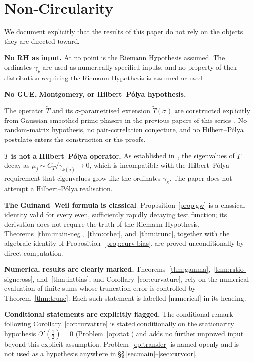 \documentclass[11pt]{article}
\newcommand{\Tt}{\widetilde{T}}
\newcommand{\CT}{C_{T}}
\begin{document}
\section{Non-Circularity}
\label{sec:nocirc}

We document explicitly that the results of this paper do not rely on
the objects they are directed toward.

\textbf{No RH as input.}
At no point is the Riemann Hypothesis assumed.
The ordinates $\gamma_k$ are used as numerically specified inputs, and
no property of their distribution requiring the Riemann Hypothesis is
assumed or used.

\textbf{No GUE, Montgomery, or Hilbert--P\'olya hypothesis.}
{\sloppy
The operator $\Tt$ and its $\sigma$-parametrised extension
$\Tt(\sigma)$ are constructed explicitly from Gaussian-smoothed prime
phasors in the previous papers of this series~\cite{Paper3,Paper4,Paper5}.
No random-matrix hypothesis, no pair-correlation conjecture, and no
Hilbert--P\'olya postulate enters the construction or the proofs.
\par}

\textbf{$\Tt$ is not a Hilbert--P\'olya operator.}
As established in~\cite{Paper5}, the eigenvalues of $\Tt$ decay as
$\mu_j\sim\CT/\gamma_{k(j)}\to 0$, which is incompatible with the
Hilbert--P\'olya requirement that eigenvalues grow like the ordinates
$\gamma_k$.
The paper does not attempt a Hilbert--P\'olya realisation.

\textbf{The Guinand--Weil formula is classical.}
Proposition~\ref{prop:gw} is a classical identity valid for every even,
sufficiently rapidly decaying test function; its derivation does not
require the truth of the Riemann Hypothesis.
Theorems~\ref{thm:main-neg},~\ref{thm:other}, and~\ref{thm:trunc},
together with the algebraic identity of Proposition~\ref{prop:curv-bias},
are proved unconditionally by direct computation.

\textbf{Numerical results are clearly marked.}
Theorems~\ref{thm:gamma},~\ref{thm:ratio-signcross},
and~\ref{thm:intbias}, and Corollary~\ref{cor:curvature}, rely on the
numerical evaluation of finite sums whose truncation error is
controlled by Theorem~\ref{thm:trunc}.
Each such statement is labelled [numerical] in its heading.

\textbf{Conditional statements are explicitly flagged.}
The conditional remark following Corollary~\ref{cor:curvature} is
stated conditionally on the stationarity hypothesis $O'(\tfrac12)=0$
(Problem~\ref{op:stat}) and adds no further unproved input beyond this
explicit assumption.
Problem~\ref{op:transfer} is named openly and is not used as a
hypothesis anywhere in \S\S\,\ref{sec:main}--\ref{sec:curvcor}.
\end{document}
